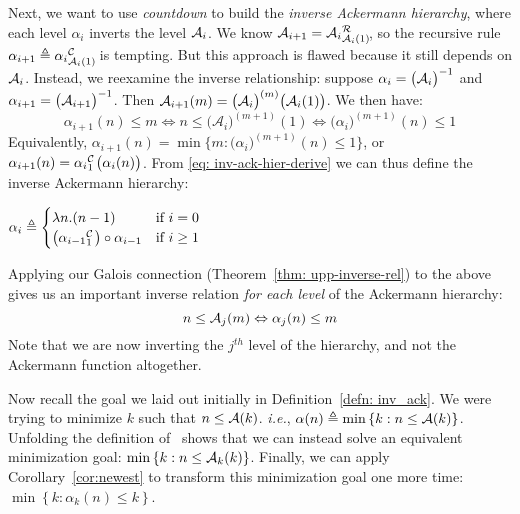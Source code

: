 Next, we want to use \emph{countdown} to build the \emph{inverse Ackermann hierarchy}, where each
level $\alpha_i$ inverts the level $\mathcal{A}_i$.
We know $\Ack_{i+1} = \rf{\Ack_i}{\Ack_i(1)}$\hspace{0.2em}, so the recursive
rule $\alpha_{i+1} \triangleq \cdt{\alpha_i}{\Ack_i(1)}$ is tempting.
But this approach is flawed because it still depends on $\mathcal{A}_i$.
Instead, we reexamine the inverse relationship: suppose $\alpha_i = \big(\mathcal{A}_i\big)^{-1}$ and $\alpha_{i+1} = \big(\mathcal{A}_{i+1}\big)^{-1}$. Then $\mathcal{A}_{i+1}(m) = \big(\mathcal{A}_{i}\big)^{(m)} \big(\mathcal{A}_{i}(1)\big)$. We then have:
\begin{equation} \label{eq: inv-ack-hier-derive}
\alpha_{i+1}(n)\le m \iff n\le \big(\mathcal{A}_i\big)^{(m+1)}(1) \iff \big(\alpha_i\big)^{(m+1)}(n) \le 1
\end{equation}
Equivalently, $\alpha_{i+1}(n) = \min\big\{m : \big( \alpha_i \big)^{(m+1)}(n)\le 1\big\}$, or $\alpha_{i+1}(n) = \cdt{\alpha_i}{1}\big(\alpha_i(n)\big)$. From \eqref{eq: inv-ack-hier-derive} we can thus define the inverse Ackermann hierarchy:
\begin{defn} \label{defn: inv-ack-hier}
	$ \alpha_i \triangleq \begin{cases}
	\lambda n.(n - 1) & \text{if } i = 0
	\\ \big(\cdt{\alpha_{i-1}}{1}\big)\circ \alpha_{i-1} & \text{if } i\ge 1 \end{cases}
$
\end{defn}

\begin{col}\label{cor:newest}
Applying our Galois connection (Theorem~\ref{thm: upp-inverse-rel}) to the above
gives us an important inverse relation \emph{for each level} of 
the Ackermann hierarchy:
\begin{equation*}
n \le \mathcal{A}_j(m) \Leftrightarrow \alpha_j(n) \le m
\end{equation*}
Note that we are now inverting the $j^{th}$ level of the hierarchy,
and not the Ackermann function altogether.
\end{col}

Now recall the goal we laid out initially in Definition~\ref{defn: inv_ack}.
We were trying to minimize $k$ such that $n \le \mathcal{A}(k)$. \emph{i.e.},
$\alpha(n) \triangleq \min\left\{k : n \le \mathcal{A}(k)\right\}$.
Unfolding the definition of \Ack~shows that we can instead solve an equivalent 
minimization goal:
$\min\left\{k : n \le \mathcal{A}_k(k)\right\}$.
Finally, we can apply Corollary~\ref{cor:newest} to transform this
minimization goal one more time:
\lb $\min\left\{k : \alpha_k(n) \le k\right\}$.




